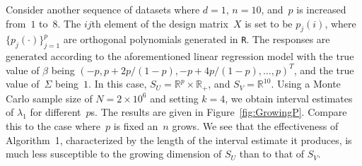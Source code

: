 \documentclass[11pt]{article}
\begin{document}
	
	Consider another sequence of datasets where $d=1$, $n=10$, and~$p$ is increased from~$1$ to~$8$.
	The $ij$th element of the design matrix~$X$ is set to be $p_j(i)$, where $\{p_j(\cdot)\}_{j=1}^p$ are orthogonal polynomials generated in \verb|R|.
	The responses are generated according to the aforementioned linear regression model with the true value of $\beta$ being $(-p, p+2p/(1-p), -p + 4p/(1-p), \dots, p)^T$, and the true value of~$\Sigma$ being~$1$.
	In this case, $S_U = \mathbb{R}^p \times \mathbb{R}_+$, and $S_V = \mathbb{R}^{10}$. 
	Using a Monte Carlo sample size of $N=2 \times 10^6$ and setting $k=4$, we obtain interval estimates of $\lambda_1$ for different~$p$s.
	The results are given in Figure~\ref{fig:GrowingP}.
	Compare this to the case where~$p$ is fixed an~$n$ grows.
	We see that the effectiveness of Algorithm~1, characterized by the length of the interval estimate it produces, is much less susceptible to the growing dimension of $S_U$ than to that of $S_V$.
	
\end{document}
